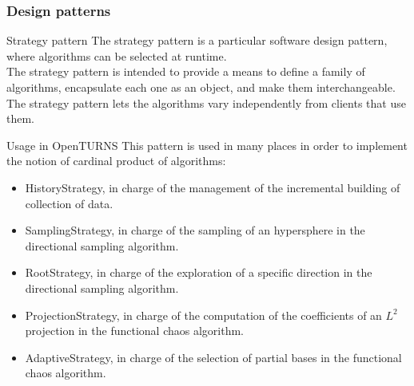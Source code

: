 \documentclass[8pt]{beamer}
\begin{document}
\begin{frame}
  \frametitle{Design patterns}
  \begin{block}{Strategy pattern}
    The \alert{strategy pattern} is a particular software design pattern, where algorithms can be selected at runtime.\\
    The strategy pattern is intended to provide a means to define a family of algorithms, encapsulate each one as an object, and make them interchangeable. The strategy pattern lets the algorithms vary independently from clients that use them.
  \end{block}
  \begin{block}{Usage in OpenTURNS}
    This pattern is used in many places in order to implement the notion of cardinal product of algorithms:
    \begin{itemize}
    \item \alert{HistoryStrategy}, in charge of the management of the incremental building of collection of data.
    \item \alert{SamplingStrategy}, in charge of the sampling of an hypersphere in the directional sampling algorithm.
    \item \alert{RootStrategy}, in charge of the exploration of a specific direction in the directional sampling algorithm.
    \item \alert{ProjectionStrategy}, in charge of the computation of the coefficients of an $L^2$ projection in the functional chaos algorithm.
    \item \alert{AdaptiveStrategy}, in charge of the selection of partial bases in the functional chaos algorithm.
    \end{itemize}
  \end{block}
\end{frame}
\end{document}
